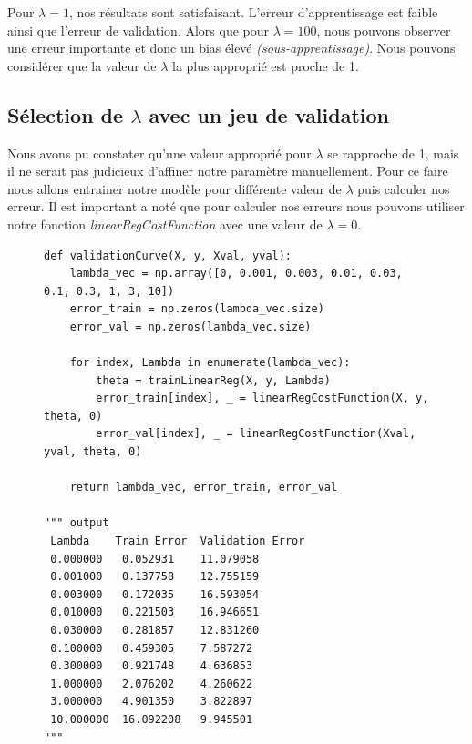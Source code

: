 Pour $\lambda = 1$, nos résultats sont satisfaisant. L'erreur d'apprentissage est faible ainsi que l'erreur de validation. Alors que pour $\lambda = 100$, nous pouvons observer une erreur importante et donc un bias élevé \textit{(sous-apprentissage)}.
Nous pouvons considérer que la valeur de $\lambda$ la plus approprié est proche de 1.


\subsection{Sélection de $\lambda$ avec un jeu de validation}

Nous avons pu constater qu'une valeur approprié pour $\lambda$ se rapproche de 1, mais il ne serait pas judicieux d'affiner notre paramètre manuellement. Pour ce faire nous allons entrainer notre modèle pour différente valeur de $\lambda$ puis calculer nos erreur. Il est 
important a noté que pour calculer nos erreurs nous pouvons utiliser notre fonction \textit{linearRegCostFunction} avec une valeur de $\lambda = 0$.

\vspace{.2cm}

\begin{figure}[!h]
\begin{verbatim}
def validationCurve(X, y, Xval, yval):
    lambda_vec = np.array([0, 0.001, 0.003, 0.01, 0.03, 0.1, 0.3, 1, 3, 10])
    error_train = np.zeros(lambda_vec.size)
    error_val = np.zeros(lambda_vec.size)

    for index, Lambda in enumerate(lambda_vec):
        theta = trainLinearReg(X, y, Lambda)
        error_train[index], _ = linearRegCostFunction(X, y, theta, 0)
        error_val[index], _ = linearRegCostFunction(Xval, yval, theta, 0)

    return lambda_vec, error_train, error_val

""" output
 Lambda    Train Error	Validation Error
 0.000000	0.052931	11.079058
 0.001000	0.137758	12.755159
 0.003000	0.172035	16.593054
 0.010000	0.221503	16.946651
 0.030000	0.281857	12.831260
 0.100000	0.459305	7.587272
 0.300000	0.921748	4.636853
 1.000000	2.076202	4.260622
 3.000000	4.901350	3.822897
 10.000000	16.092208	9.945501
"""
\end{verbatim}   
\end{figure}

\vspace{.2cm}

